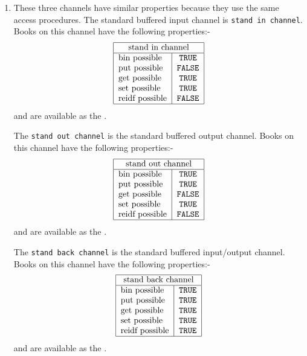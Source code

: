 \begin{enumerate}
\item {}\newline
{}\newline
{}\newline
These three channels have similar properties because they use the
same access procedures. The standard buffered input channel is
\verb|stand in channel|. Books on this channel have the following
properties:-
$$\begin{tabular}{|l|c|}\hline
  \multicolumn{2}{|c|}{stand in channel}\\ \hline
  bin possible & \texttt{TRUE}\\
  put possible & \texttt{FALSE}\\
  get possible & \texttt{TRUE}\\
  set possible & \texttt{TRUE}\\
  reidf possible & \texttt{FALSE}\\ \hline
  \end{tabular}
$$
and are available as the .

The \verb|stand out channel| is the standard buffered output channel.
Books on this channel have the following properties:-
$$\begin{tabular}{|l|c|}\hline
  \multicolumn{2}{|c|}{stand out channel}\\ \hline
  bin possible & \texttt{TRUE}\\
  put possible & \texttt{TRUE}\\
  get possible & \texttt{FALSE}\\
  set possible & \texttt{TRUE}\\
  reidf possible & \texttt{FALSE}\\ \hline
  \end{tabular}
$$
and are available as the .

The \verb|stand back channel| is the standard buffered input/output
channel. Books on this channel have the following properties:-
$$\begin{tabular}{|l|c|}\hline
  \multicolumn{2}{|c|}{stand back channel}\\ \hline
  bin possible & \texttt{TRUE}\\
  put possible & \texttt{TRUE}\\
  get possible & \texttt{TRUE}\\
  set possible & \texttt{TRUE}\\
  reidf possible & \texttt{TRUE}\\ \hline
  \end{tabular}
$$
and are available as the .


\end{enumerate}
